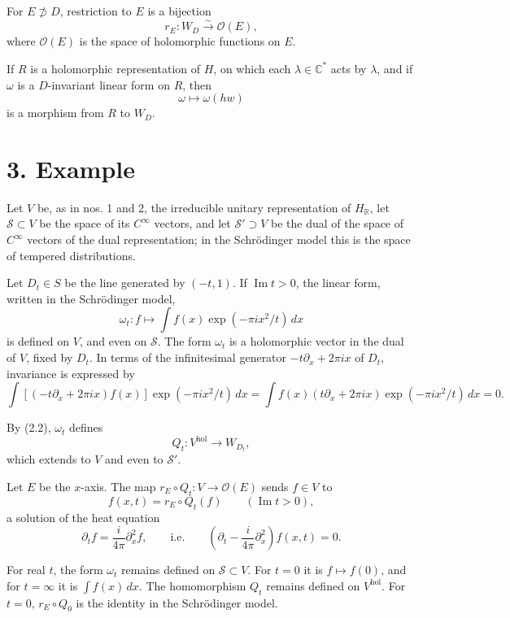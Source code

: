 \documentclass[12pt,a4paper]{article}
\theoremstyle{plain}
\theoremstyle{definition}
\theoremstyle{remark}
\DeclareMathOperator{\Impart}{Im}
\begin{document}
For $E\not\supset D$, restriction to $E$ is a bijection
\begin{equation}\label{eq:2.1}
r_E\colon W_D\xrightarrow{\sim}\mathcal O(E),\tag{2.1}
\end{equation}
where $\mathcal O(E)$ is the space of holomorphic functions on $E$.

If $R$ is a holomorphic representation of $H$, on which each $\lambda\in \mathbb C^*$ acts by $\lambda$, and if $\omega$ is a $D$-invariant linear form on $R$, then
\begin{equation}\label{eq:2.2}
\omega\mapsto \omega(hw)\tag{2.2}
\end{equation}
is a morphism from $R$ to $W_D$.

\section*{3. Example}

Let $V$ be, as in nos. 1 and 2, the irreducible unitary representation of $H_{\mathbb R}$, let $\mathcal S\subset V$ be the space of its $C^\infty$ vectors, and let $\mathcal S'\supset V$ be the dual of the space of $C^\infty$ vectors of the dual representation; in the Schrödinger model this is the space of tempered distributions.

Let $D_t\in S$ be the line generated by $(-t,1)$. If $\Impart t>0$, the linear form, written in the Schrödinger model,
\[
\omega_t\colon f\mapsto \int f(x)\exp(-\pi ix^2/t)\,dx
\]
is defined on $V$, and even on $\mathcal S$. The form $\omega_t$ is a holomorphic vector in the dual of $V$, fixed by $D_t$. In terms of the infinitesimal generator $-t\partial_x+2\pi ix$ of $D_t$, invariance is expressed by
\[
\int [(-t\partial_x+2\pi ix)f(x)]\exp(-\pi ix^2/t)\,dx
 = \int f(x)(t\partial_x+2\pi ix)\exp(-\pi ix^2/t)\,dx=0.
\]

By (2.2), $\omega_t$ defines
\[
Q_t\colon V^{\mathrm{hol}}\to W_{D_t},
\]
which extends to $V$ and even to $\mathcal S'$.

Let $E$ be the $x$-axis. The map $r_E\circ Q_t\colon V\to \mathcal O(E)$ sends $f\in V$ to
\[
f(x,t)=r_E\circ Q_t(f)\qquad (\Impart t>0),
\]
a solution of the heat equation
\[
\partial_t f=\frac{i}{4\pi}\partial_x^2 f,\qquad\text{i.e.}\qquad
\left(\partial_t-\frac{i}{4\pi}\partial_x^2\right)f(x,t)=0.
\]

For real $t$, the form $\omega_t$ remains defined on $\mathcal S\subset V$. For $t=0$ it is $f\mapsto f(0)$, and for $t=\infty$ it is $\int f(x)\,dx$. The homomorphism $Q_t$ remains defined on $V^{\mathrm{hol}}$. For $t=0$, $r_E\circ Q_0$ is the identity in the Schrödinger model.
\end{document}
